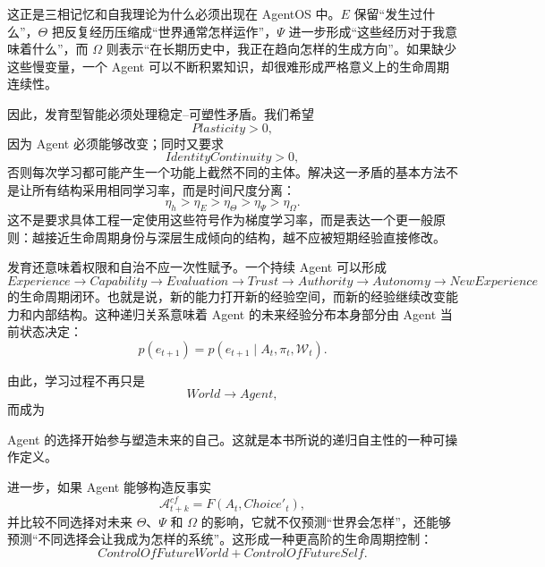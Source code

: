 这正是三相记忆和自我理论为什么必须出现在 AgentOS 中。$E$ 保留“发生过什么”，$\Theta$ 把反复经历压缩成“世界通常怎样运作”，$\Psi$ 进一步形成“这些经历对于我意味着什么”，而 $\Omega$ 则表示“在长期历史中，我正在趋向怎样的生成方向”。如果缺少这些慢变量，一个 Agent 可以不断积累知识，却很难形成严格意义上的生命周期连续性。

因此，发育型智能必须处理稳定--可塑性矛盾。我们希望
\begin{equation}
Plasticity>0,
\end{equation}
因为 Agent 必须能够改变；同时又要求
\begin{equation}
IdentityContinuity>0,
\end{equation}
否则每次学习都可能产生一个功能上截然不同的主体。解决这一矛盾的基本方法不是让所有结构采用相同学习率，而是时间尺度分离：
\begin{equation}
\eta_h
>
\eta_E
>
\eta_\Theta
>
\eta_\Psi
>
\eta_\Omega.
\end{equation}
这不是要求具体工程一定使用这些符号作为梯度学习率，而是表达一个更一般原则：越接近生命周期身份与深层生成倾向的结构，越不应被短期经验直接修改。

发育还意味着权限和自治不应一次性赋予。一个持续 Agent 可以形成
\begin{equation}
Experience
\rightarrow
Capability
\rightarrow
Evaluation
\rightarrow
Trust
\rightarrow
Authority
\rightarrow
Autonomy
\rightarrow
NewExperience
\end{equation}
的生命周期闭环。也就是说，新的能力打开新的经验空间，而新的经验继续改变能力和内部结构。这种递归关系意味着 Agent 的未来经验分布本身部分由 Agent 当前状态决定：
\begin{equation}
p(e_{t+1})
=
p
\left(
e_{t+1}
\mid
A_t,\pi_t,\mathcal{W}_t
\right).
\end{equation}

由此，学习过程不再只是
\begin{equation}
World\rightarrow Agent,
\end{equation}
而成为
\begin{statementbox}
\centering
{}
\end{statementbox}
Agent 的选择开始参与塑造未来的自己。这就是本书所说的递归自主性的一种可操作定义。

进一步，如果 Agent 能够构造反事实
\begin{equation}
\mathcal{A}^{cf}_{t+k}
=
F
\left(
A_t,
Choice'_t
\right),
\end{equation}
并比较不同选择对未来 $\Theta$、$\Psi$ 和 $\Omega$ 的影响，它就不仅预测“世界会怎样”，还能够预测“不同选择会让我成为怎样的系统”。这形成一种更高阶的生命周期控制：
\begin{equation}
\boxed{
ControlOfFutureWorld
+
ControlOfFutureSelf.
}
\end{equation}

